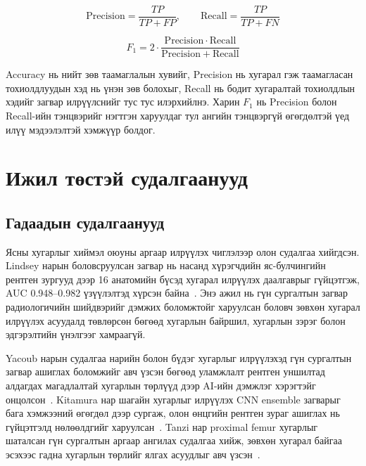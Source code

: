 \begin{equation}
    \mathrm{Precision} = \frac{TP}{TP + FP},
    \qquad
    \mathrm{Recall} = \frac{TP}{TP + FN}
    \label{eq:precision_recall}
\end{equation}

\begin{equation}
    F_1 = 2 \cdot
    \frac{\mathrm{Precision}\cdot\mathrm{Recall}}
    {\mathrm{Precision}+\mathrm{Recall}}
    \label{eq:f1}
\end{equation}

Accuracy нь нийт зөв таамаглалын хувийг, Precision нь хугарал гэж таамагласан тохиолдлуудын хэд нь үнэн зөв болохыг, Recall нь бодит хугаралтай тохиолдлын хэдийг загвар илрүүлснийг тус тус илэрхийлнэ. Харин $F_1$ нь Precision болон Recall-ийн тэнцвэрийг нэгтгэн харуулдаг тул ангийн тэнцвэргүй өгөгдөлтэй үед илүү мэдээлэлтэй хэмжүүр болдог.


\section{Ижил төстэй судалгаанууд}

\subsection*{Гадаадын судалгаанууд}

Ясны хугарлыг хиймэл оюуны аргаар илрүүлэх чиглэлээр олон судалгаа хийгдсэн. Lindsey нарын боловсруулсан загвар нь насанд хүрэгчдийн яс-булчингийн рентген зургууд дээр 16 анатомийн бүсэд хугарал илрүүлэх даалгаврыг гүйцэтгэж, AUC 0.948--0.982 үзүүлэлтэд хүрсэн байна~\cite{ref08}. Энэ ажил нь гүн сургалтын загвар радиологичийн шийдвэрийг дэмжих боломжтойг харуулсан боловч зөвхөн хугарал илрүүлэх асуудалд төвлөрсөн бөгөөд хугарлын байршил, хугарлын зэрэг болон эдгэрэлтийн үнэлгээг хамраагүй.

Yacoub нарын судалгаа нарийн болон бүдэг хугарлыг илрүүлэхэд гүн сургалтын загвар ашиглах боломжийг авч үзсэн бөгөөд уламжлалт рентген уншилтад алдагдах магадлалтай хугарлын төрлүүд дээр AI-ийн дэмжлэг хэрэгтэйг онцолсон~\cite{ref10}. Kitamura нар шагайн хугарлыг илрүүлэх CNN ensemble загварыг бага хэмжээний өгөгдөл дээр сургаж, олон өнцгийн рентген зураг ашиглах нь гүйцэтгэлд нөлөөлдгийг харуулсан~\cite{ref14}. Tanzi нар proximal femur хугарлыг шаталсан гүн сургалтын аргаар ангилах судалгаа хийж, зөвхөн хугарал байгаа эсэхээс гадна хугарлын төрлийг ялгах асуудлыг авч үзсэн~\cite{ref15}.

